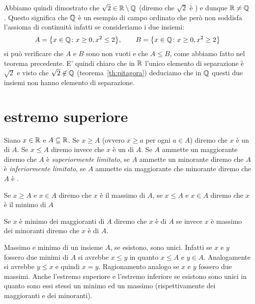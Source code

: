 Abbiamo quindi dimostrato che $\sqrt{2} \in \mathbb R \setminus \mathbb Q$
(diremo che $\sqrt 2$ è
%
%
) e dunque $\mathbb R \neq \mathbb Q$.
Questo significa che $\mathbb Q$ è un esempio di campo ordinato che però
non soddisfa l'assioma di continuità infatti se consideriamo i due insiemi:
\[
 A = {\left\{ x\in \mathbb Q \colon x\ge 0, x^2 \le 2 \right\}},\qquad
 B = {\left\{ x\in \mathbb Q \colon x\ge 0, x^2 \ge 2 \right\}}
\]
si può verificare che $A$ e $B$ sono non vuoti e che $A \le B$,
come abbiamo fatto nel teorema precedente.
E' quindi chiaro che in $\mathbb R$ l'unico elemento di separazione
è $\sqrt 2$ e visto che $\sqrt 2\not \in \mathbb Q$ (teorema~\ref{th:pitagora})
deduciamo che in $\mathbb Q$ questi due insiemi non hanno elemento di separazione.

\section{estremo superiore}

\begin{definition}
\mymark{***}
Siano $x \in \mathbb R$ e $A \subseteq \mathbb R$.
Se $x \ge A$ (ovvero $x \ge a$ per ogni $a\in A$)
diremo che $x$ è un  di $A$.
Se $x \le A$ diremo invece che $x$ è un  di $A$.
Se $A$ ammette un maggiorante diremo che $A$ è \emph{superiormente limitato},
se $A$ ammette un minorante diremo che $A$ è \emph{inferiormente limitato},
se $A$ ammette sia maggiorante che minorante diremo che $A$ è .

Se $x\ge A$ e $x\in A$ diremo che $x$ è il massimo di $A$,
se $x\le A$ e $x\in A$ diremo che $x$ è il minimo di $A$

Se $x$ è minimo dei maggioranti di $A$ diremo che $x$ è
di $A$ se invece $x$ è massimo dei minoranti diremo che $x$ è
 di $A$.
\end{definition}

Massimo e minimo di un insieme $A$, se esistono, sono unici.
Infatti se $x$ e $y$ fossero due minimi di $A$ si avrebbe $x\le y$ in
quanto $x\le A$ e $y\in A$. Analogamente si avrebbe $y\le x$ e
quindi $x=y$. Ragionamento analogo se $x$ e $y$ fossero due massimi.
Anche l'estremo superiore e l'estremo inferiore se esistono sono
unici in quanto sono essi stessi un minimo ed un massimo
(rispettivamente dei maggioranti e dei minoranti).

